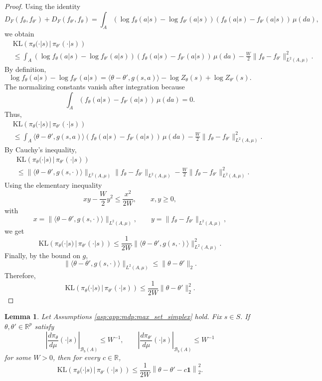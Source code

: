 \documentclass{amsart}
\newtheorem{lemma}[theorem]{Lemma}
\theoremstyle{definition}
\begin{document}
\begin{proof}
Using the identity
\[
D_F(f_\theta,f_{\theta'})
+
D_F(f_{\theta'},f_\theta)
=
\int_{ A}
\left(
\log f_\theta(a|s)-\log f_{\theta'}(a|s)
\right)
\left(
f_\theta(a|s)-f_{\theta'}(a|s)
\right)
\,\mu(da),
\]
we obtain
\begin{align*}
&\mathrm{KL}\left(
\pi_\theta(\cdot|s)\,|\,\pi_{\theta'}(\cdot|s)
\right) \\
&\le
\int_{ A}
\left(
\log f_\theta(a|s)-\log f_{\theta'}(a|s)
\right)
\left(
f_\theta(a|s)-f_{\theta'}(a|s)
\right)
\,\mu(da)
-
\frac{W}{2}
\|f_\theta-f_{\theta'}\|_{L^2(A,\mu)}^2 .
\end{align*}
By definition,
\[
\log f_\theta(a|s)-\log f_{\theta'}(a|s)
=
\langle \theta-\theta',g(s,a)\rangle
-
\log Z_\theta(s)
+
\log Z_{\theta'}(s).
\]
The normalizing constants vanish after integration because
\[
\int_{ A}
\left(
f_\theta(a|s)-f_{\theta'}(a|s)
\right)\,\mu(da)=0.
\]
Thus,
\begin{align*}
&\mathrm{KL}\left(
\pi_\theta(\cdot|s)\,|\,\pi_{\theta'}(\cdot|s)
\right) \\
&\le
\int_{ A}
\langle \theta-\theta',g(s,a)\rangle
\left(
f_\theta(a|s)-f_{\theta'}(a|s)
\right)
\,\mu(da)
-
\frac{W}{2}
\|f_\theta-f_{\theta'}\|_{L^2(A,\mu)}^2 .
\end{align*}
By Cauchy's inequality,
\begin{align*}
&\mathrm{KL}\left(
\pi_\theta(\cdot|s)\,|\,\pi_{\theta'}(\cdot|s)
\right) \\
&\le
\|\langle \theta-\theta',g(s,\cdot)\rangle\|_{L^2(A,\mu)}
\|f_\theta-f_{\theta'}\|_{L^2(A,\mu)}
-
\frac{W}{2}
\|f_\theta-f_{\theta'}\|_{L^2(A,\mu)}^2 .
\end{align*}
Using the elementary inequality
\[
xy-\frac{W}{2}y^2\le \frac{x^2}{2W},
\qquad x,y\ge 0,
\]
with
\[
x=\|\langle \theta-\theta',g(s,\cdot)\rangle\|_{L^2(A,\mu)},
\qquad
y=\|f_\theta-f_{\theta'}\|_{L^2(A,\mu)},
\]
we get
\[
\mathrm{KL}\left(
\pi_\theta(\cdot|s)\,|\,\pi_{\theta'}(\cdot|s)
\right)
\le
\frac{1}{2W}
\|\langle \theta-\theta',g(s,\cdot)\rangle\|_{L^2(A,\mu)}^2 .
\]
Finally, by the bound on $g$,
\[
\|\langle \theta-\theta',g(s,\cdot)\rangle\|_{L^2(A,\mu)}
\le
\|\theta-\theta'\|_2.
\]
Therefore,
\[
\mathrm{KL}\left(
\pi_\theta(\cdot|s)\,|\,\pi_{\theta'}(\cdot|s)
\right)
\le
\frac{1}{2W}\|\theta-\theta'\|_2^2 .
\]
\end{proof}

\begin{lemma}\label{lem:app:kl-logit_ineq}
Let Assumptions \ref{asp:app:mdp:max_set_simplex} hold.
Fix $s\in S$. 
If $\theta,\theta'\in\mathbb R^p$ satisfy
\[
\left|
\frac{d\pi_\theta}{d\mu}(\cdot|s)
\right|_{\mathcal B_b( A)}
\le W^{-1},
\qquad
\left|
\frac{d\pi_{\theta'}}{d\mu}(\cdot|s)
\right|_{\mathcal B_b( A)}
\le W^{-1}
\]
for some $W>0$, then for every $c\in\mathbb R$,
\[
\mathrm{KL}\left(
\pi_\theta(\cdot|s)\,|\,\pi_{\theta'}(\cdot|s)
\right)
\le
\frac{1}{2W}
\left\|
\theta-\theta'-c\mathbf 1
\right\|_2^2 .
\]
\end{lemma}
\end{document}
